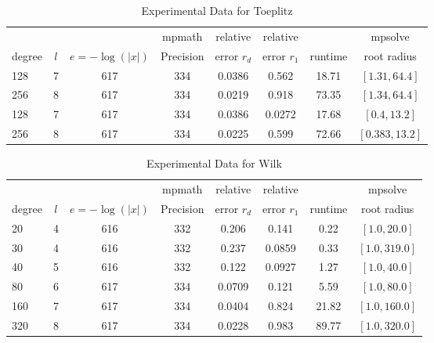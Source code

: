 \documentclass[sigconf]{acmart}
\begin{document}
\begin{table}[t]
\caption{Experimental Data for Toeplitz}
\label{tab:toep}
\vskip -0.15in
\begin{center}
\begin{small}
\begin{sc}
\begin{tabular}{lccccccc}
\toprule
&  &  & mpmath & relative  & relative &  & mpsolve \\
degree  & $l$& $e=-\log(|x|)$& Precision &error $r_d$       & error $r_1$ &runtime& root radius\\
\midrule
 128 & 7 & 617 & 334 & 0.0386 & 0.562 & 18.71 & $[1.31, 64.4]$\\
 256 & 8 & 617 & 334 & 0.0219 & 0.918 & 73.35 & $[1.34, 64.4]$\\
 128 & 7 & 617 & 334 & 0.0386 & 0.0272 & 17.68 & $[0.4, 13.2]$\\
 256 & 8 & 617 & 334 & 0.0225 & 0.599 & 72.66 & $[0.383, 13.2]$\\
\bottomrule
\end{tabular}
\end{sc}
\end{small}
\end{center}
\vskip 0.05in
\end{table}


\begin{table}[t]
\caption{Experimental Data for Wilk}
\label{tab:wilk}
\vskip -0.15in
\begin{center}
\begin{small}
\begin{sc}
\begin{tabular}{lccccccc}
\toprule
&  &  & mpmath & relative  & relative &  & mpsolve \\
degree  & $l$& $e=-\log(|x|)$& Precision &error $r_d$       & error $r_1$ &runtime& root radius\\
\midrule
 20 & 4 & 616 & 332 & 0.206 & 0.141 & 0.22 & $[1.0, 20.0]$\\
 30 & 4 & 616 & 332 & 0.237 & 0.0859 & 0.33 & $[1.0, 319.0]$\\
 40 & 5 & 616 & 332 & 0.122 & 0.0927 & 1.27 & $[1.0, 40.0]$\\
 80 & 6 & 617 & 334 & 0.0709 & 0.121 & 5.59 & $[1.0, 80.0]$\\
 160 & 7 & 617 & 334 & 0.0404 & 0.824 & 21.82 & $[1.0, 160.0]$\\
 320 & 8 & 617 & 334 & 0.0228 & 0.983 & 89.77 & $[1.0, 320.0]$\\
\bottomrule
\end{tabular}
\end{sc}
\end{small}
\end{center}
\vskip 0.05in
\end{table}
\end{document}
